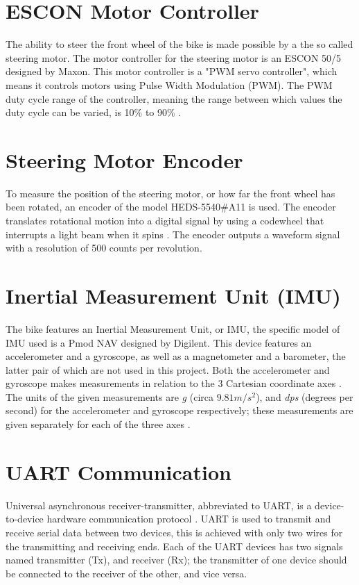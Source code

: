 \section{ESCON Motor Controller}
The ability to steer the front wheel of the bike is made possible by a the so called steering motor. The motor controller for the steering motor is an ESCON 50/5 designed by Maxon. This motor controller is a "PWM servo controller", which means it controls motors using Pulse Width Modulation (PWM). The PWM duty cycle range of the controller, meaning the range between which values the duty cycle can be varied, is 10\% to 90\% \cite{Maxon2021ESCONReference}.

\section{Steering Motor Encoder}
To measure the position of the steering motor, or how far the front wheel has been rotated, an encoder of the model HEDS-5540\#A11 is used. The encoder translates rotational motion into a digital signal by using a codewheel that interrupts a light beam when it spins \cite{AvagoTechnologies2014HEDM-55xx/560xHEDS-55xx/56xx}. The encoder outputs a waveform signal with a resolution of 500 counts per revolution.

\section{Inertial Measurement Unit (IMU)}
The bike features an Inertial Measurement Unit, or IMU, the specific model of IMU used is a Pmod NAV designed by Digilent. This device features an accelerometer and a gyroscope, as well as a magnetometer and a barometer, the latter pair of which are not used in this project. Both the accelerometer and gyroscope makes measurements in relation to the 3 Cartesian coordinate axes \cite{Digilent2017PmodManual}. The units of the given measurements are \textit{g} (circa $9.81 m/s^2$), and \textit{dps} (degrees per second) for the accelerometer and gyroscope respectively; these measurements are given separately for each of the three axes \cite{STMicroelectronics2015INEMOMagnetometer}.

\section{UART Communication}
Universal asynchronous receiver-transmitter, abbreviated to UART, is a device-to-device hardware communication protocol \cite{GraceLegaspi2020UART:Receiver/Transmitter}. UART is used to transmit and receive serial data between two devices, this is achieved with only two wires for the transmitting and receiving ends. Each of the UART devices has two signals named transmitter (Tx), and receiver (Rx); the transmitter of one device should be connected to the receiver of the other, and vice versa.

